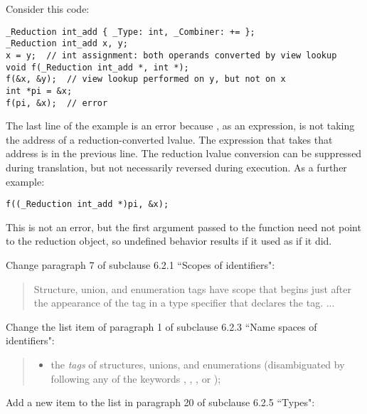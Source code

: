 \begin{example}
Consider this code:

\begin{verbatim}
_Reduction int_add { _Type: int, _Combiner: += };
_Reduction int_add x, y;
x = y;	// int assignment: both operands converted by view lookup
void f(_Reduction int_add *, int *);
f(&x, &y);  // view lookup performed on y, but not on x
int *pi = &x;
f(pi, &x);  // error
\end{verbatim}

The last line of the example is an error because
,
as an expression,
is not taking the address of a reduction-converted lvalue.
The expression that takes that address is in the previous line.
The reduction lvalue conversion can be suppressed during translation,
but not necessarily reversed during execution.
As a further example:

\begin{verbatim}
f((_Reduction int_add *)pi, &x);
\end{verbatim}

This is not an error,
but the first argument passed to the function
need not point to the reduction object,
so undefined behavior results if it used as if it did.
\end{example}


Change paragraph 7 of subclause 6.2.1 ``Scopes of identifiers":

\begin{quote}
Structure, union,
and enumeration tags have scope that begins
just after the appearance of the tag
in a type specifier that declares the tag. ...
\end{quote}

Change the list item of paragraph 1
of subclause 6.2.3 ``Name spaces of identifiers":

\begin{quote}
\begin{itemize}
\item
the
\textit{tags}
of structures, unions,
and enumerations
(disambiguated by following any of the keywords
,
,
,
or
);
\end{itemize}
\end{quote}

Add a new item
to the list in paragraph 20 of subclause 6.2.5 ``Types":

